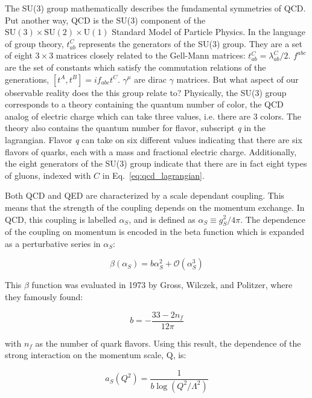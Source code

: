 The SU(3) group mathematically describes the fundamental symmetries of QCD. Put another way, QCD is the SU(3) component of the $\mathrm{SU(3)}\times\mathrm{SU(2)}\times\mathrm{U(1)}$ Standard Model of Particle Physics. In the language of group theory, $t_{ab}^C$ represents the generators of the SU(3) group. They are a set of eight $3\times3$ matrices closely related to the Gell-Mann matrices: $t_{ab}^C = \lambda_{ab}^C/2$. $f^{abc}$ are the set of constants which satisfy the commutation relations of the generations, $[t^A,t^B] = if_{abc}t^C$. $\gamma^\mu$ are dirac $\gamma$ matrices.
But what aspect of our observable reality does the this group relate to? Physically, the SU(3) group corresponds to a theory containing the quantum number of color, the QCD analog of electric charge which can take three values, i.e. there are 3 colors. The theory also contains the quantum number for flavor, subscript \textit{q} in the lagrangian. Flavor \textit{q} can take on six different values indicating that there are six flavors of quarks, each with a mass and  fractional electric charge. Additionally, the eight generators of the SU(3) group indicate that there are in fact eight types of gluons, indexed with $C$ in Eq.~\ref{eq:qcd_lagrangian}.
 
Both QCD and QED are characterized by a scale dependant coupling. This means that the strength of the coupling depends on the momentum exchange. In QCD, this coupling is labelled $\alpha_S$, 
and is defined as  $\alpha_S \equiv g_S^2/4\pi$. The dependence of the 
coupling on momentum is encoded in the beta function which is expanded as a perturbative series in $\alpha_S$:

\begin{equation}
  \beta(\alpha_S) = b\alpha_S^2+\mathcal{O}(\alpha_S^3) 
  \label{eq:beta}
\end{equation}

This $\beta$ function was evaluated in 1973 by Gross, Wilczek, and Politzer, \cite{Gross1973,Politzer1973}where they famously found:

  \begin{equation}
    b =  -\frac{33 - 2n_f}{12\pi} 
    \label{eq:b}
  \end{equation}

with $n_f$ as the number of quark flavors. Using this result, the dependence of the strong interaction on the momentum scale, Q, is:

  \begin{equation}
    a_S(Q^2) = \frac{1}{b\log(Q^2/\Lambda^2)}
  \label{eq:a_S_running}
  \end{equation}

